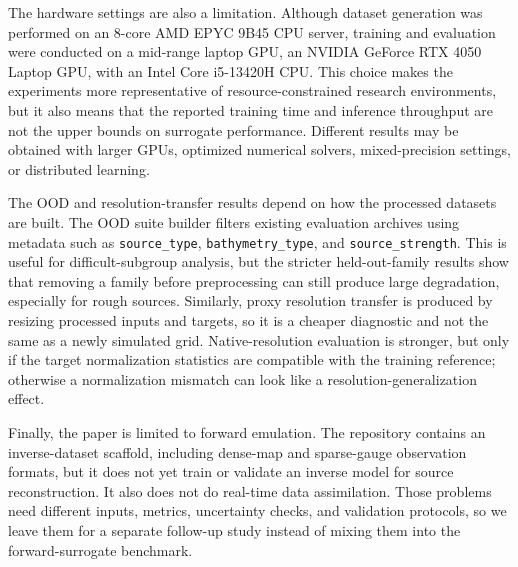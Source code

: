 The hardware settings are also a limitation. Although dataset generation was performed on an 8-core AMD EPYC 9B45 CPU server, training and evaluation were conducted on a mid-range laptop GPU, an NVIDIA GeForce RTX 4050 Laptop GPU, with an Intel Core i5-13420H CPU. This choice makes the experiments more representative of resource-constrained research environments, but it also means that the reported training time and inference throughput are not the upper bounds on surrogate performance. Different results may be obtained with larger GPUs, optimized numerical solvers, mixed-precision settings, or distributed learning.

The OOD and resolution-transfer results depend on how the processed datasets are built. The OOD suite builder filters existing evaluation archives using metadata such as \texttt{source\_type}, \texttt{bathymetry\_type}, and \texttt{source\_strength}. This is useful for difficult-subgroup analysis, but the stricter held-out-family results show that removing a family before preprocessing can still produce large degradation, especially for rough sources. Similarly, proxy resolution transfer is produced by resizing processed inputs and targets, so it is a cheaper diagnostic and not the same as a newly simulated grid. Native-resolution evaluation is stronger, but only if the target normalization statistics are compatible with the training reference; otherwise a normalization mismatch can look like a resolution-generalization effect.

Finally, the paper is limited to forward emulation. The repository contains an inverse-dataset scaffold, including dense-map and sparse-gauge observation formats, but it does not yet train or validate an inverse model for source reconstruction. It also does not do real-time data assimilation. Those problems need different inputs, metrics, uncertainty checks, and validation protocols, so we leave them for a separate follow-up study instead of mixing them into the forward-surrogate benchmark.
